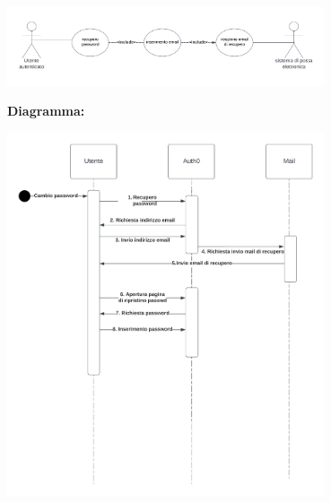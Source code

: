 \begin{listaPersonale}[UC]{}
    \newpage

    \begin{center}
        \includegraphics[width=0.7\textwidth]{img/Diagrammi/UseCases/RecuperoPassword.png}
    \end{center}


    \textbf{Diagramma:}
    \begin{center}
        \includegraphics[width=0.7\textwidth]{img/Diagrammi/DS/DS_RecuperoPassword.png}
    \end{center}

\end{listaPersonale}